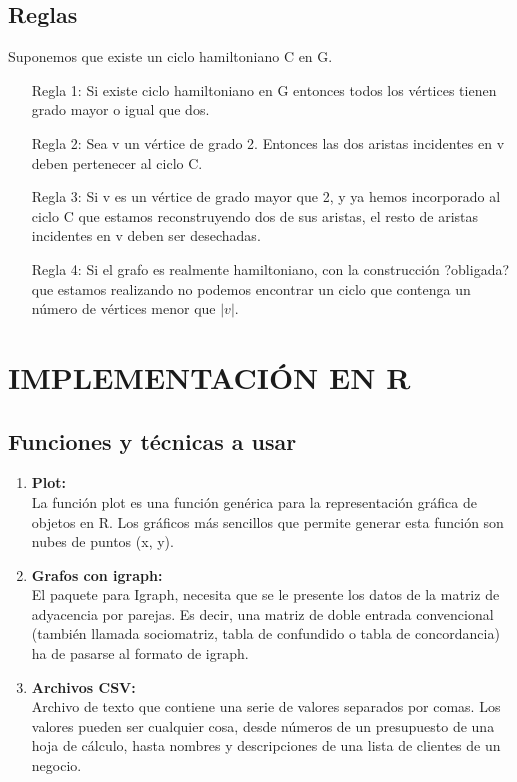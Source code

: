 \documentclass[journal]{IEEEtran}
\begin{document}
\subsection{Reglas}
	Suponemos que existe un ciclo hamiltoniano C en G.
\begin{enumerate}
	\item[Regla 1:]  Si existe ciclo hamiltoniano en G entonces todos los v{\'e}rtices tienen grado mayor o igual que dos.
	\item[Regla 2:] Sea v un v{\'e}rtice de grado 2. Entonces las dos aristas incidentes en v deben pertenecer al ciclo C.
	\item[Regla 3:] Si v es un vértice de grado mayor que 2, y ya hemos incorporado al ciclo C que estamos reconstruyendo dos de sus aristas, el resto de aristas incidentes en v deben ser desechadas.
	\item[Regla 4:] Si el grafo es realmente hamiltoniano, con la construcci{\'o}n ?obligada? que estamos realizando no podemos encontrar un ciclo que contenga un número de vértices menor que $|v|$.
\end{enumerate}

\section{IMPLEMENTACI{\'O}N EN R}

\subsection{Funciones y t{\'e}cnicas a usar}

\begin{enumerate}
	\item{\bf Plot:}\\ La funci{\'o}n plot es una función gen{\'e}rica para la representaci{\'o}n gr{\'a}fica de objetos en R. Los gr{\'a}ficos m{\'a}s sencillos que permite generar esta funci{\'o}n son nubes de puntos (x, y).
	
	\item{\bf Grafos con igraph:}\\ El paquete para Igraph, necesita que se le presente los datos de la matriz de adyacencia por parejas. Es decir, una matriz de doble entrada convencional (tambi{\'e}n llamada sociomatriz, tabla de confundido o tabla de concordancia) ha de pasarse al formato de igraph.
	
	\item{\bf Archivos CSV:}\\ Archivo de texto que contiene una serie de valores separados por comas. Los valores pueden ser cualquier cosa, desde n{\'u}meros de un presupuesto de una hoja de c{\'a}lculo, hasta nombres y descripciones de una lista de clientes de un negocio.
	
\end{enumerate}
\end{document}
